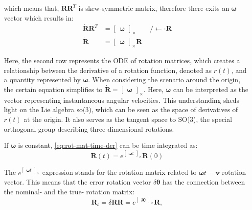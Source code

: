 which means that, $\dot{\mathbf{R}}\mathbf{R}^T$ is skew-symmetric matrix, therefore there exits an $\boldsymbol{\omega}$ vector which results in:
\begin{equation}
\begin{aligned}
    \dot{\mathbf{R}}\mathbf{R}^T&=\begin{bmatrix}\boldsymbol{\omega}\end{bmatrix}_\times \qquad /\leftarrow\cdot\mathbf{R} \\
     \dot{\mathbf{R}}&=\begin{bmatrix}\boldsymbol{\omega}\end{bmatrix}_\times\mathbf{R}
\end{aligned}
\label{eq:rot-mat-time-der}
\end{equation}

Here, the second row represents the ODE of rotation matrices, which creates a relationship between the derivative of a rotation function, denoted as $r(t)$, and a quantity represented by $\boldsymbol{\omega}$. When considering the scenario around the origin, the certain equation simplifies to $\dot{\mathbf{R}}=\begin{bmatrix} \boldsymbol{\omega} \end{bmatrix}_\times$. Here, $\boldsymbol{\omega}$ can be interpreted as the vector representing instantaneous angular velocities. This understanding sheds light on the Lie algebra so(3), which can be seen as the space of derivatives of $r(t)$ at the origin. It also serves as the tangent space to SO(3), the special orthogonal group describing three-dimensional rotations.

If $\boldsymbol{\omega}$ is constant, \eqref{eq:rot-mat-time-der} can be time integrated as:
\begin{equation}
    \mathbf{R}(t)=e^{\begin{bmatrix} \boldsymbol{\omega}t \end{bmatrix}_\times}\mathbf{R}(0)
\end{equation}

The $e^{\begin{bmatrix} \boldsymbol{\omega}t \end{bmatrix}_\times}$ expression stands for the rotation matrix related to $\boldsymbol{\omega}t=\mathbf{v}$ rotation vector. This means that the error rotation vector $\delta\boldsymbol{\theta}$ has the connection between the nominal- and the true- rotation matrix:
\begin{equation}
    \mathbf{R}_t=\delta\mathbf{R}\mathbf{R}=e^{\begin{bmatrix}\delta\boldsymbol{\theta}\end{bmatrix}_\times}\mathbf{R},
\end{equation}

